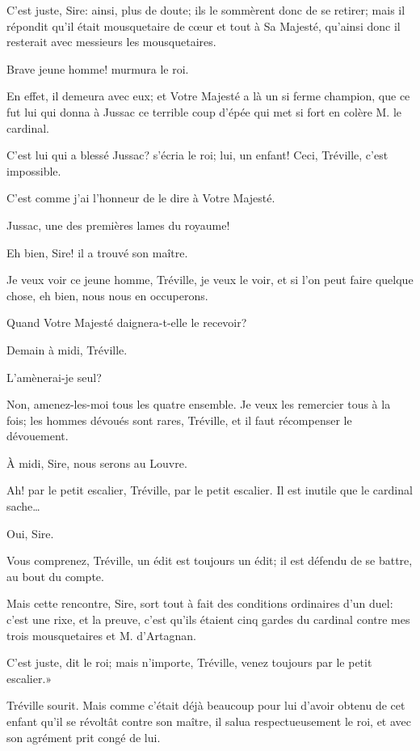 \speak  C'est juste, Sire: ainsi, plus de doute; ils le sommèrent donc de se retirer; mais il répondit qu'il était mousquetaire de cœur et tout à Sa Majesté, qu'ainsi donc il resterait avec messieurs les mousquetaires. 

\speak  Brave jeune homme! murmura le roi. 

\speak  En effet, il demeura avec eux; et Votre Majesté a là un si ferme champion, que ce fut lui qui donna à Jussac ce terrible coup d'épée qui met si fort en colère M. le cardinal. 

\speak  C'est lui qui a blessé Jussac? s'écria le roi; lui, un enfant! Ceci, Tréville, c'est impossible. 

\speak  C'est comme j'ai l'honneur de le dire à Votre Majesté. 

\speak  Jussac, une des premières lames du royaume! 

\speak  Eh bien, Sire! il a trouvé son maître. 

\speak  Je veux voir ce jeune homme, Tréville, je veux le voir, et si l'on peut faire quelque chose, eh bien, nous nous en occuperons. 

\speak  Quand Votre Majesté daignera-t-elle le recevoir? 

\speak  Demain à midi, Tréville. 

\speak  L'amènerai-je seul? 

\speak  Non, amenez-les-moi tous les quatre ensemble. Je veux les remercier tous à la fois; les hommes dévoués sont rares, Tréville, et il faut récompenser le dévouement. 

\speak  À midi, Sire, nous serons au Louvre. 

\speak  Ah! par le petit escalier, Tréville, par le petit escalier. Il est inutile que le cardinal sache\dots 

\speak  Oui, Sire. 

\speak  Vous comprenez, Tréville, un édit est toujours un édit; il est défendu de se battre, au bout du compte. 

\speak  Mais cette rencontre, Sire, sort tout à fait des conditions ordinaires d'un duel: c'est une rixe, et la preuve, c'est qu'ils étaient cinq gardes du cardinal contre mes trois mousquetaires et M. d'Artagnan. 

\speak  C'est juste, dit le roi; mais n'importe, Tréville, venez toujours par le petit escalier.» 

Tréville sourit. Mais comme c'était déjà beaucoup pour lui d'avoir obtenu de cet enfant qu'il se révoltât contre son maître, il salua respectueusement le roi, et avec son agrément prit congé de lui. 

